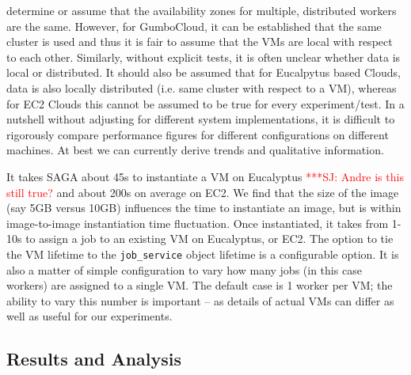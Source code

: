 \documentclass[conference,final]{IEEEtran}
\newcommand{\jhanote}[1]{ {\textcolor{red} { ***SJ: #1 }}}
\newcommand{\jhanote}[1]{}
\begin{document}
determine or assume that the availability zones for multiple,
distributed workers are the same. However, for GumboCloud, it can be
established that the same cluster is used and thus it is fair to
assume that the VMs are local with respect to each other.  Similarly,
without explicit tests, it is often unclear whether data is local or
distributed.  It should also be assumed that for Eucalpytus based
Clouds, data is also locally distributed (i.e.  same cluster with
respect to a VM), whereas for EC2 Clouds this cannot be assumed to be
true for every experiment/test. In a nutshell without adjusting for
different system implementations, it is difficult to rigorously
compare performance figures for different configurations on different
machines. At best we can currently derive trends and qualitative
information.

It takes SAGA about 45s to instantiate a VM on Eucalyptus
\jhanote{Andre is this still true?}  and about 200s on average on EC2.
We find that the size of the image (say 5GB versus 10GB) influences
the time to instantiate an image, but is within image-to-image
instantiation time fluctuation.  Once instantiated, it takes from
1-10s to assign a job to an existing VM on Eucalyptus, or EC2.  The
option to tie the VM lifetime to the \texttt{job\_service} object
lifetime is a configurable option.  It is also a matter of simple
configuration to vary how many jobs (in this case workers) are
assigned to a single VM. The default case is 1 worker per VM; the
ability to vary this number is important -- as details of actual VMs
can differ as well as useful for our experiments.

\subsection{Results and Analysis}
\end{document}
